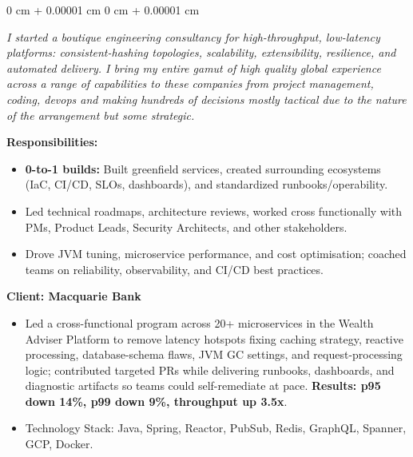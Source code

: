 \documentclass[10pt, letterpaper]{article}
\newenvironment{onecolentry}{
    \begin{adjustwidth}{
        0 cm + 0.00001 cm
    }{
        0 cm + 0.00001 cm
    }
}{
    \end{adjustwidth}
} %
\begin{document}
        \vspace{0.10 cm}
        \begin{onecolentry}
            \begin{adjustwidth}{0.5cm}{0cm}
            \textit{I started a boutique engineering consultancy for high-throughput, low-latency platforms: consistent-hashing topologies, scalability, extensibility, resilience, and automated delivery. I bring my entire gamut of high quality global experience across a range of capabilities to these companies from project management, coding, devops and making hundreds of decisions mostly tactical due to the nature of the arrangement but some strategic.}
            \end{adjustwidth}
            
            \vspace{0.10 cm}
            \hspace{0.5cm}\textbf{Responsibilities:}
            \begin{itemize}[
                topsep=0.10 cm,
                parsep=0.10 cm,
                partopsep=0pt,
                itemsep=0pt,
                leftmargin=0 cm + 10pt + 0.5cm
            ]
                \item \textbf{0-to-1 builds:} Built greenfield services, created surrounding ecosystems (IaC, CI/CD, SLOs, dashboards), and standardized runbooks/operability.
                \item Led technical roadmaps, architecture reviews, worked cross functionally with PMs, Product Leads, Security Architects, and other stakeholders.
                \item Drove JVM tuning, microservice performance, and cost optimisation; coached teams on reliability, observability, and CI/CD best practices.
            \end{itemize}
            
            \vspace{0.10 cm}
            \hspace{0.5cm}\textbf{Client: Macquarie Bank}
            \begin{itemize}[
                topsep=0.10 cm,
                parsep=0.10 cm,
                partopsep=0pt,
                itemsep=0pt,
                leftmargin=0 cm + 10pt + 0.5cm
            ]
                \item Led a cross-functional program across 20+ microservices in the Wealth Adviser Platform to remove latency hotspots fixing caching strategy, reactive processing, database-schema flaws, JVM GC settings, and request-processing logic; contributed targeted PRs while delivering runbooks, dashboards, and diagnostic artifacts so teams could self-remediate at pace. \textbf{Results: p95 down 14\%, p99 down 9\%, throughput up 3.5x}.
                \item Technology Stack: Java, Spring, Reactor, PubSub, Redis, GraphQL, Spanner, GCP, Docker.
            \end{itemize}
            

\end{onecolentry}
\end{document}

